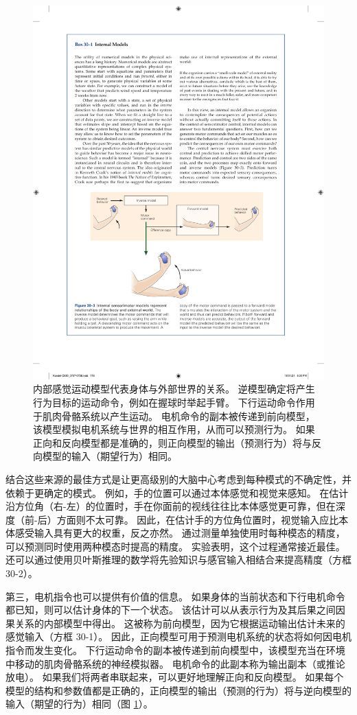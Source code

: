 \begin{figure}[htbp]
	\centering
	\includegraphics[width=0.8\linewidth]{chap30/fig_30_3}
	\caption{内部感觉运动模型代表身体与外部世界的关系。 逆模型确定将产生行为目标的运动命令，例如在握球时举起手臂。 下行运动命令作用于肌肉骨骼系统以产生运动。 电机命令的副本被传递到前向模型，该模型模拟电机系统与世界的相互作用，从而可以预测行为。 如果正向和反向模型都是准确的，则正向模型的输出（预测行为）将与反向模型的输入（期望行为）相同。}
	\label{fig:30_3}
\end{figure}


结合这些来源的最佳方式是让更高级别的大脑中心考虑到每种模式的不确定性，并依赖于更确定的模式。 例如，手的位置可以通过本体感觉和视觉来感知。 在估计沿方位角（右-左）的位置时，手在你面前的视线往往比本体感觉更可靠，但在深度（前-后）方面则不太可靠。 因此，在估计手的方位角位置时，视觉输入应比本体感受输入具有更大的权重，反之亦然。 通过测量单独使用时每种模态的精度，可以预测同时使用两种模态时提高的精度。 实验表明，这个过程通常接近最佳。 还可以通过使用贝叶斯推理的数学将先验知识与感官输入相结合来提高精度（方框 30-2）。

第三，电机指令也可以提供有价值的信息。 如果身体的当前状态和下行电机命令都已知，则可以估计身体的下一个状态。 该估计可以从表示行为及其后果之间因果关系的内部模型中得出。 这被称为前向模型，因为它根据运动输出估计未来的感觉输入（方框 30-1）。 因此，正向模型可用于预测电机系统的状态将如何因电机指令而发生变化。 下行运动命令的副本被传递到前向模型中，该模型充当在环境中移动的肌肉骨骼系统的神经模拟器。 电机命令的此副本称为输出副本（或推论放电）。 如果我们将两者串联起来，可以更好地理解正向和反向模型。 如果每个模型的结构和参数值都是正确的，正向模型的输出（预测的行为）将与逆向模型的输入（期望的行为）相同（图 \ref{fig:30_3}）。

